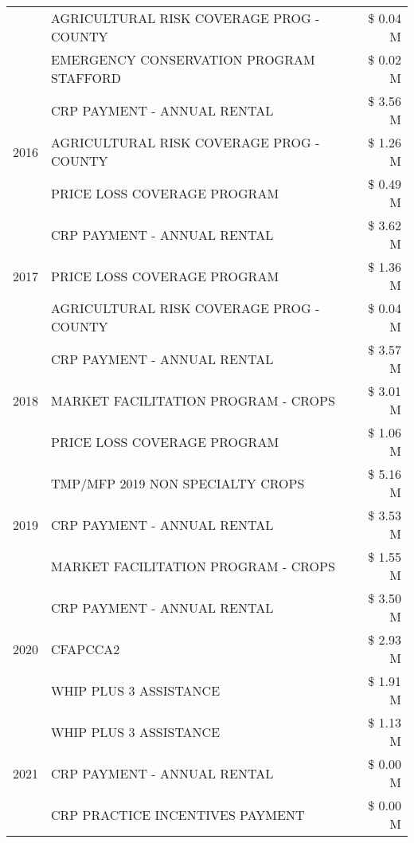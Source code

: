 \begin{tabular}{llr}
 & AGRICULTURAL RISK COVERAGE PROG - COUNTY & \$ 0.04 M \\
 & EMERGENCY CONSERVATION PROGRAM STAFFORD & \$ 0.02 M \\
\cline{1-3}
\multirow[t]{3}{*}{2016} & CRP PAYMENT - ANNUAL RENTAL & \$ 3.56 M \\
 & AGRICULTURAL RISK COVERAGE PROG - COUNTY & \$ 1.26 M \\
 & PRICE LOSS COVERAGE PROGRAM & \$ 0.49 M \\
\cline{1-3}
\multirow[t]{3}{*}{2017} & CRP PAYMENT - ANNUAL RENTAL & \$ 3.62 M \\
 & PRICE LOSS COVERAGE PROGRAM & \$ 1.36 M \\
 & AGRICULTURAL RISK COVERAGE PROG - COUNTY & \$ 0.04 M \\
\cline{1-3}
\multirow[t]{3}{*}{2018} & CRP PAYMENT - ANNUAL RENTAL & \$ 3.57 M \\
 & MARKET FACILITATION PROGRAM - CROPS & \$ 3.01 M \\
 & PRICE LOSS COVERAGE PROGRAM & \$ 1.06 M \\
\cline{1-3}
\multirow[t]{3}{*}{2019} & TMP/MFP 2019 NON SPECIALTY CROPS & \$ 5.16 M \\
 & CRP PAYMENT - ANNUAL RENTAL & \$ 3.53 M \\
 & MARKET FACILITATION PROGRAM - CROPS & \$ 1.55 M \\
\cline{1-3}
\multirow[t]{3}{*}{2020} & CRP PAYMENT - ANNUAL RENTAL & \$ 3.50 M \\
 & CFAPCCA2 & \$ 2.93 M \\
 & WHIP PLUS 3 ASSISTANCE & \$ 1.91 M \\
\cline{1-3}
\multirow[t]{3}{*}{2021} & WHIP PLUS 3 ASSISTANCE & \$ 1.13 M \\
 & CRP PAYMENT - ANNUAL RENTAL & \$ 0.00 M \\
 & CRP PRACTICE INCENTIVES PAYMENT & \$ 0.00 M \\
\cline{1-3}
\bottomrule
\end{tabular}
